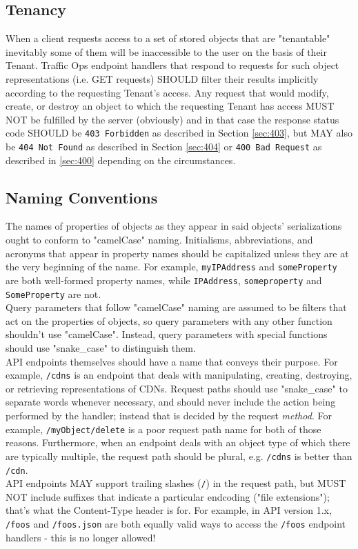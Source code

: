 \documentclass{article}
\newcommand{\code}[1]{\texttt{\color{inlinecodecolor}#1}}
\begin{document}
\subsection{Tenancy\label{sec:tenancy}}
When a client requests access to a set of stored objects that are "tenantable" inevitably some of them will be inaccessible to the user
on the basis of their Tenant. Traffic Ops endpoint handlers that respond to requests for such object representations (i.e. GET requests)
SHOULD filter their results implicitly according to the requesting Tenant's access. Any request that would modify, create, or destroy an
object to which the requesting Tenant has access MUST NOT be fulfilled by the server (obviously) and in that case the response status code
SHOULD be \code{403 Forbidden} as described in Section \ref{sec:403}, but MAY also be \code{404 Not Found} as described in Section \ref{sec:404}
or \code{400 Bad Request} as described in \ref{sec:400} depending on the circumstances.

\subsection{Naming Conventions}
The names of properties of objects as they appear in said objects' serializations ought to conform to "camelCase" naming. Initialisms,
abbreviations, and acronyms that appear in property names should be capitalized unless they are at the very beginning of the name. For
example, \code{myIPAddress} and \code{someProperty} are both well-formed property names, while \code{IPAddress}, \code{someproperty} and
\code{SomeProperty} are not.\\
Query parameters that follow "camelCase" naming are assumed to be filters that act on the properties of objects, so query parameters with
any other function shouldn't use "camelCase". Instead, query parameters with special functions should use "snake\_case" to distinguish them.\\
API endpoints themselves should have a name that conveys their purpose. For example, \code{/cdns} is an endpoint that deals with manipulating,
creating, destroying, or retrieving representations of CDNs. Request paths should use "snake\_case" to separate words whenever necessary, and
should never include the action being performed by the handler; instead that is decided by the request \emph{method}. For example,
\code{/myObject/delete} is a poor request path name for both of those reasons. Furthermore, when an endpoint deals with an object type of
which there are typically multiple, the request path should be plural, e.g. \code{/cdns} is better than \code{/cdn}.\\
API endpoints MAY support trailing slashes (\code{/}) in the request path, but MUST NOT include suffixes that indicate a particular endcoding
("file extensions"); that's what the Content-Type header is for. For example, in API version 1.x, \code{/foos} and \code{/foos.json} are both
equally valid ways to access the \code{/foos} endpoint handlers - this is no longer allowed!
\end{document}
